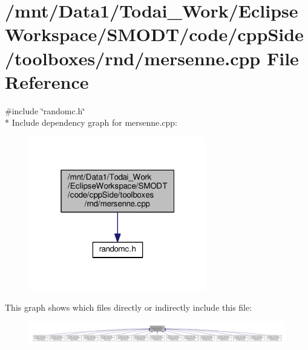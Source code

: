 \section{/mnt/\-Data1/\-Todai\-\_\-\-Work/\-Eclipse\-Workspace/\-S\-M\-O\-D\-T/code/cpp\-Side/toolboxes/rnd/mersenne.cpp File Reference}
\label{toolboxes_2rnd_2mersenne_8cpp}
{\ttfamily \#include \char`\"{}randomc.\-h\char`\"{}}\\*
Include dependency graph for mersenne.\-cpp\-:
\nopagebreak
\begin{figure}[H]
\begin{center}
\leavevmode
\includegraphics[width=220pt]{toolboxes_2rnd_2mersenne_8cpp__incl}
\end{center}
\end{figure}
This graph shows which files directly or indirectly include this file\-:
\nopagebreak
\begin{figure}[H]
\begin{center}
\leavevmode
\includegraphics[width=350pt]{toolboxes_2rnd_2mersenne_8cpp__dep__incl}
\end{center}
\end{figure}
